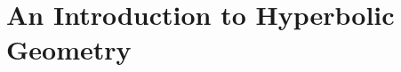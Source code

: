 \documentclass[Shifrin_Solutions_Spring_2018]{subfiles}
\begin{document}
\section{An Introduction to Hyperbolic Geometry}

\begin{exercise}

\end{exercise}

\begin{exercise}

\end{exercise}

\begin{exercise}

\end{exercise}


\begin{exercise}

\end{exercise}


\begin{exercise}

\end{exercise}


\begin{exercise}

\end{exercise}


\begin{exercise}

\end{exercise}


\begin{exercise}

\end{exercise}


\begin{exercise}

\end{exercise}


\begin{exercise}

\end{exercise}


\begin{exercise}

\end{exercise}


\begin{exercise}

\end{exercise}


\begin{exercise}

\end{exercise}


\begin{exercise}

\end{exercise}


\begin{exercise}

\end{exercise}


\begin{exercise}

\end{exercise}


\begin{exercise}

\end{exercise}
\end{document}
